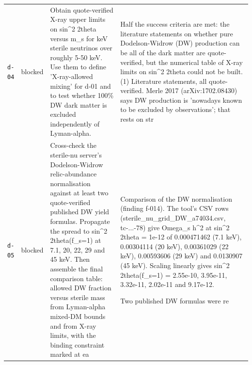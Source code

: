 \documentclass[11pt,a4paper]{article}
\begin{document}
\begin{longtable}{@{}p{}p{}p{}p{}@{}}
\texttt{d-04} & blocked & Obtain quote-verified X-ray upper limits on sin\textasciicircum{}2 2theta versus m\_s for keV sterile neutrinos over roughly 5-50 keV. Use them to define 'X-ray-allowed mixing' for d-01 and to test whether 100\% DW dark matter is excluded independently of Lyman-alpha. & Half the success criteria are met: the literature statements on whether pure Dodelson-Widrow (DW) production can be all of the dark matter are quote-verified, but the numerical table of X-ray limits on sin\textasciicircum{}2 2theta could not be built. (1) Literature statements, all quote-verified. Merle 2017 (arXiv:1702.08430) says DW production is 'nowadays known to be excluded by observations'; that rests on str \\
\texttt{d-05} & blocked & Cross-check the sterile-nu server's Dodelson-Widrow relic-abundance normalisation against at least two quote-verified published DW yield formulas. Propagate the spread to sin\textasciicircum{}2 2theta(f\_s=1) at 7.1, 20, 22, 29 and 45 keV. Then assemble the final comparison table: allowed DW fraction versus sterile mass from Lyman-alpha mixed-DM bounds and from X-ray limits, with the binding constraint marked at ea & Comparison of the DW normalisation (finding f-014). The tool's CSV rows (sterile\_nu\_grid\_DW\_a74034.csv, tc-...-78) give Omega\_s h\textasciicircum{}2 at sin\textasciicircum{}2 2theta = 1e-12 of 0.000471462 (7.1 keV), 0.00304114 (20 keV), 0.00361029 (22 keV), 0.00593606 (29 keV) and 0.0130907 (45 keV). Scaling linearly gives sin\textasciicircum{}2 2theta(f\_s=1) = 2.55e-10, 3.95e-11, 3.32e-11, 2.02e-11 and 9.17e-12.

Two published DW formulas were re \\
\bottomrule\end{longtable}
\end{document}
